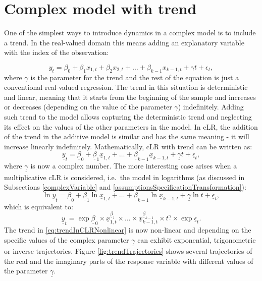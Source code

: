 \documentclass[
]{book}
\begin{document}
\hypertarget{DynamicTrend}{%
\section{Complex model with trend}\label{DynamicTrend}}

One of the simplest ways to introduce dynamics in a complex model is to include a trend. In the real-valued domain this means adding an explanatory variable with the index of the observation:

\begin{equation}
    {y}_t = {\beta}_0 + {\beta}_1 {x}_{1,t} + {\beta}_2 {x}_{2,t} + \dots + {\beta}_{k-1} {x}_{k-1,t} + \gamma t + {\epsilon}_t,
    \label{eq:trendInRealModel}
\end{equation}
where \(\gamma\) is the parameter for the trend and the rest of the equation is just a conventional real-valued regression. The trend in this situation is deterministic and linear, meaning that it starts from the beginning of the sample and increases or decreases (depending on the value of the parameter \(\gamma\)) indefinitely. Adding such trend to the model allows capturing the deterministic trend and neglecting its effect on the values of the other parameters in the model. In cLR, the addition of the trend in the additive model is similar and has the same meaning - it will increase linearly indefinitely. Mathematically, cLR with trend can be written as:
\begin{equation}
    \underline{y}_t = \underline{\beta}_0 + \underline{\beta}_1 \underline{x}_{1,t} + \dots + \underline{\beta}_{k-1} \underline{x}_{k-1,t} + \underline{\gamma} t + \underline{\epsilon}_t ,
    \label{eq:trendInCLR}
\end{equation}
where \(\underline{\gamma}\) is now a complex number. The more interesting case arises when a multiplicative cLR is considered, i.e.~the model in logarithms (as discussed in Subsections \ref{complexVariable} and \ref{assumptionsSpecificationTransformation}):
\begin{equation}
    \ln \underline{y}_t = \underline{\beta}_0 + \underline{\beta}_1 \ln \underline{x}_{1,t} + \dots + \underline{\beta}_{k-1} \ln \underline{x}_{k-1,t} + \underline{\gamma} \ln t + \underline{\epsilon}_t ,
    \label{eq:trendInCLRLogs}
\end{equation}
which is equivalent to:
\begin{equation}
    \underline{y}_t = \exp \underline{\beta}_0 \times \underline{x}_{1,t}^{\underline{\beta}_1} \times \dots \times \underline{x}_{k-1,t}^{\underline{\beta}_{k-1}} \times t^{\underline{\gamma}} \times \exp \underline{\epsilon}_t .
    \label{eq:trendInCLRNonlinear}
\end{equation}
The trend in \eqref{eq:trendInCLRNonlinear} is now non-linear and depending on the specific values of the complex parameter \(\underline{\gamma}\) can exhibit exponential, trigonometric or inverse trajectories. Figure \ref{fig:trendTrajectories} shows several trajectories of the real and the imaginary parts of the response variable with different values of the parameter \(\underline{\gamma}\).
\end{document}
